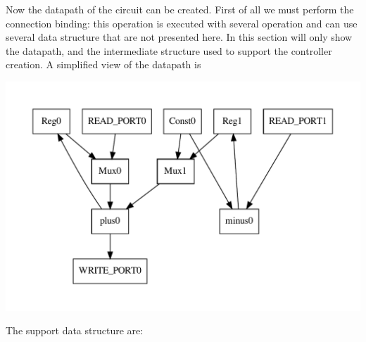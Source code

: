 Now the datapath of the circuit can be created. First of all we must perform the connection binding\+: this operation is executed with several operation and can use several data structure that are not presented here. In this section will only show the datapath, and the intermediate structure used to support the controller creation. A simplified view of the datapath is 
\begin{DoxyImageNoCaption}
  \mbox{\includegraphics[width=\textwidth,height=\textheight/2,keepaspectratio=true]{dot_inline_dotgraph_24}}
\end{DoxyImageNoCaption}
 The support data structure are\+:
